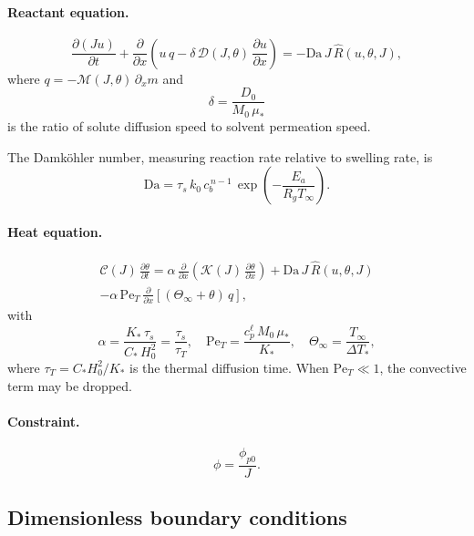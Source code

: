 \documentclass[aps,pre,reprint,superscriptaddress,longbibliography,floatfix]{revtex4-2}
\newcommand{\Ms}{\mathcal{M}}
\newcommand{\Ds}{\mathcal{D}}
\newcommand{\Cs}{\mathcal{C}}
\newcommand{\Ks}{\mathcal{K}}
\newcommand{\Da}{\mathrm{Da}}
\newcommand{\Pe}{\mathrm{Pe}}
\newcommand{\Rhat}{\widehat{R}}
\newcommand{\pp}{\phi_{p0}}
\begin{document}
\paragraph{Reactant equation.}
\begin{equation}
  \frac{\partial(J u)}{\partial t}
  + \frac{\partial}{\partial x}\!\left(u\,q - \delta\,\Ds(J,\theta)\,\frac{\partial u}{\partial x}\right)
  = -\Da\,J\,\Rhat(u,\theta,J),
  \label{eq:u_nondim}
\end{equation}
where $q = -\Ms(J,\theta)\,\partial_x m$ and
\begin{equation}
  \delta = \frac{D_0}{M_0\,\mu_*}
\end{equation}
is the ratio of solute diffusion speed to solvent permeation speed.

The Damk\"ohler number, measuring reaction rate relative to swelling rate, is
\begin{equation}
  \Da = \tau_s\,k_0\,c_b^{\,n-1}\,\exp\!\left(-\frac{E_a}{R_g T_\infty}\right).
  \label{eq:Da}
\end{equation}

\paragraph{Heat equation.}
\begin{multline}
  \Cs(J)\,\frac{\partial\theta}{\partial t}
  = \alpha\,\frac{\partial}{\partial x}\!\left(\Ks(J)\,\frac{\partial\theta}{\partial x}\right)
  + \Da\,J\,\Rhat(u,\theta,J)
  \\
  - \alpha\,\Pe_T\,\frac{\partial}{\partial x}\!\left[(\Theta_\infty + \theta)\,q\right],
  \label{eq:theta_nondim}
\end{multline}
with
\begin{equation}
  \alpha = \frac{K_*\,\tau_s}{C_*\,H_0^2} = \frac{\tau_s}{\tau_T},
  \quad
  \Pe_T = \frac{c_p^\ell\,M_0\,\mu_*}{K_*},
  \quad
  \Theta_\infty = \frac{T_\infty}{\Delta T_*},
  \label{eq:thermal_params}
\end{equation}
where $\tau_T = C_*H_0^2/K_*$ is the thermal diffusion time.
When $\Pe_T \ll 1$, the convective term may be dropped.

\paragraph{Constraint.}
\begin{equation}
  \phi = \frac{\pp}{J}.
\end{equation}

\subsection{Dimensionless boundary conditions}
\end{document}
